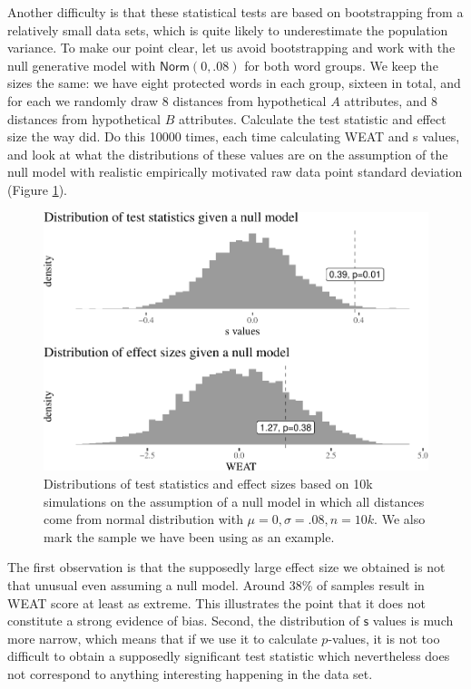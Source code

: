 \documentclass{clv3}
\begin{document}
Another difficulty is that these statistical tests are
based on bootstrapping from a relatively small data sets, which is quite
likely to underestimate the population variance. To make our point
clear, let us avoid bootstrapping and work with the null generative
model with \(\mathsf{Norm}(0,.08)\) for both word groups. We keep the
sizes the same: we have eight protected words in each group, sixteen in
total, and for each we randomly draw 8 distances from hypothetical \(A\)
attributes, and \(8\) distances from hypothetical \(B\) attributes.
Calculate the test statistic and effect size the way \citep{Caliskan2017semanticsBiases} did. Do
this 10000 times, each time calculating \textsf{WEAT} and \textsf{s}
values, and look at what the distributions of these values are on the
assumption of the null model with realistic empirically motivated raw
data point standard deviation (Figure \ref{fig:ourDistances}).

\begin{figure}

\begin{center}\includegraphics[width=0.8\linewidth]{figures/figourDistancesPlot2f} \end{center}

\caption{Distributions of test statistics and effect sizes based on 10k simulations on the assumption of a null model in which all distances come from normal distribution with $\mu =0, \sigma = .08, n=10k$. We also mark the sample we have been using as an example.}
\label{fig:ourDistances}
\end{figure}

The first observation is that the supposedly large effect size we
obtained is not that unusual even assuming a null model. Around 38\% of
samples result in \textsf{WEAT} score at least as extreme. This
illustrates the point that it does not constitute a strong evidence of
bias. Second, the distribution of \(\textsf{s}\) values is much more
narrow, which means that if we use it to calculate \(p\)-values, it is
not too difficult to obtain a supposedly significant test statistic
which nevertheless does not correspond to anything interesting happening
in the data set.
\end{document}
